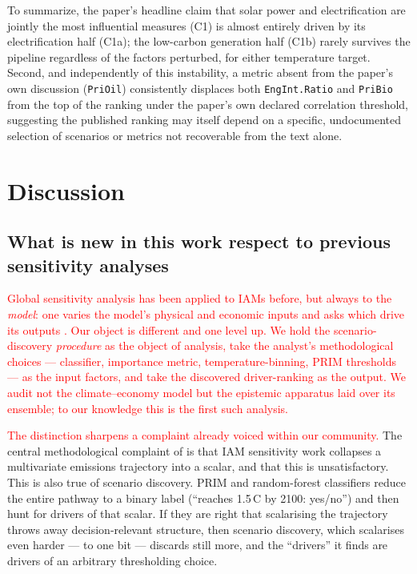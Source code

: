\documentclass[sn-basic]{sn-jnl}%
\begin{document}
To summarize, the paper's headline claim that solar power and electrification are jointly the most
influential measures (C1) is almost entirely driven by its electrification half (C1a); the low-carbon generation half (C1b) rarely survives the pipeline regardless of the factors perturbed, for either temperature target. Second, and independently of this instability, a metric absent from the paper's own discussion (\texttt{PriOil}) consistently displaces both \texttt{EngInt.Ratio} and \texttt{PriBio} from the top of the ranking under the paper's own declared correlation threshold, suggesting the
published ranking may itself depend on a specific, undocumented selection of scenarios or metrics not recoverable from the text alone.





\section{Discussion}

\subsection{What is new in this work respect to previous sensitivity analyses}
\textcolor{red}{Global sensitivity analysis has been applied to IAMs before, but always to the \emph{model}: one varies the model's physical and economic inputs and asks which drive its outputs \citep{Chiani_Borgonovo_Plischke_Tavoni_2025}. Our object is different and one level up. We hold the scenario-discovery \emph{procedure} as the object of analysis, take the analyst's methodological choices --- classifier, importance metric, temperature-binning, PRIM thresholds --- as the input factors, and take the discovered driver-ranking as the output. We audit not the climate--economy model but the epistemic apparatus laid over its ensemble; to our knowledge this is the first such analysis.}

\textcolor{red}{The distinction sharpens a complaint already voiced within our community.} The central methodological complaint of \cite{Chiani_Borgonovo_Plischke_Tavoni_2025} is that IAM
sensitivity work collapses a multivariate emissions trajectory into a scalar,
and that this is unsatisfactory. This is also true of scenario discovery. PRIM and random-forest classifiers reduce the entire pathway
to a binary label (``reaches 1.5\,\textdegree C by 2100: yes/no'') and then
hunt for drivers of that scalar. If they are right that scalarising the
trajectory throws away decision-relevant structure, then scenario discovery,
which scalarises even harder --- to one bit --- discards still more, and the
``drivers'' it finds are drivers of an arbitrary thresholding choice. 
\end{document}
